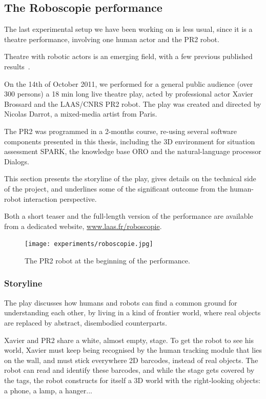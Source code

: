 \subsection{The Roboscopie performance}
\label{sect|roboscopie}

The last experimental setup we have been working on is less usual, since it is
a theatre performance, involving one human actor and the PR2 robot.

Theatre with robotic actors is an emerging field, with a few previous published
results~\cite{Breazeal2003, Lin2009, Mavridis2009}.

On the 14th of October 2011, we performed for a general public audience (over
300 persons) a 18 min long live theatre play, acted by professional actor
Xavier Brossard and the LAAS/CNRS PR2 robot. The play was created and directed
by Nicolas Darrot, a mixed-media artist from Paris.

The PR2 was programmed in a 2-months course, re-using several software
components presented in this thesis, including the 3D environment for situation
assessment SPARK, the knowledge base ORO and the natural-language
processor {\sc Dialogs}.

This section presents the storyline of the play, gives details on the technical
side of the project, and underlines some of the significant outcome from the
human-robot interaction perspective.

Both a short teaser and the full-length version of the performance are
available from a dedicated website, \url{www.laas.fr/roboscopie}.

\begin{figure}
    \centering
    \texttt{[image: experiments/roboscopie.jpg]}
    \caption{The PR2 robot at the beginning of the performance.}
    \label{fig|pr2-opens-curtains}
\end{figure}


\subsubsection{Storyline}

The play discusses how humans and robots can find a common ground for understanding
each other, by living in a kind of frontier world, where real objects are replaced 
by abstract, disembodied counterparts.

Xavier and PR2 share a white, almost empty, stage. To get the robot to see his
world, Xavier must keep being recognised by the human tracking module that lies
on the wall, and must stick everywhere 2D barcodes, instead of real
objects. The robot can read and identify these barcodes, and while the stage
gets covered by the tags, the robot constructs for itself a 3D world with the
right-looking objects: a phone, a lamp, a hanger...

